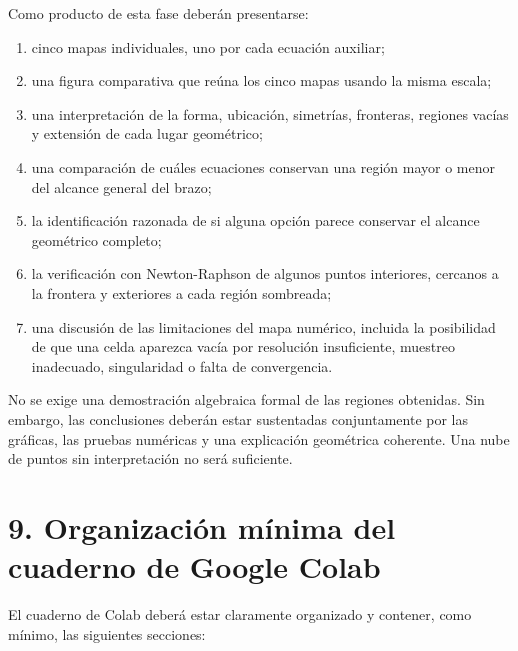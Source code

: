 \documentclass[12pt]{article}
\begin{document}
Como producto de esta fase deberán presentarse:

\begin{enumerate}[label=\alph*)]
    \item cinco mapas individuales, uno por cada ecuación auxiliar;
    \item una figura comparativa que reúna los cinco mapas usando la misma escala;
    \item una interpretación de la forma, ubicación, simetrías, fronteras, regiones vacías y extensión de cada lugar geométrico;
    \item una comparación de cuáles ecuaciones conservan una región mayor o menor del alcance general del brazo;
    \item la identificación razonada de si alguna opción parece conservar el alcance geométrico completo;
    \item la verificación con Newton-Raphson de algunos puntos interiores, cercanos a la frontera y exteriores a cada región sombreada;
    \item una discusión de las limitaciones del mapa numérico, incluida la posibilidad de que una celda aparezca vacía por resolución insuficiente, muestreo inadecuado, singularidad o falta de convergencia.
\end{enumerate}

No se exige una demostración algebraica formal de las regiones obtenidas. Sin embargo, las conclusiones deberán estar sustentadas conjuntamente por las gráficas, las pruebas numéricas y una explicación geométrica coherente. Una nube de puntos sin interpretación no será suficiente.

\section*{9. Organización mínima del cuaderno de Google Colab}

El cuaderno de Colab deberá estar claramente organizado y contener, como mínimo, las siguientes secciones:
\end{document}

